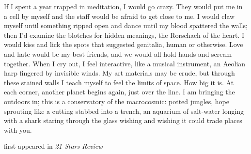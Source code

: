 If I spent a year trapped in meditation, I would go crazy. They would
put me in a cell by myself and the staff would be afraid to get close to
me. I would claw myself until something ripped open and dance until my
blood spattered the walls; then I'd examine the blotches for hidden
meanings, the Rorschach of the heart. I would kiss and lick the spots
that suggested genitalia, human or otherwise. Love and hate would be my
best friends, and we would all hold hands and scream together. When I
cry out, I feel interactive, like a musical instrument, an Aeolian harp
fingered by invisible winds. My art materials may be crude, but through
these stained walls I teach myself to feel the limits of space. How big
it is. At each corner, another planet begins again, just over the line.
I am bringing the outdoors in; this is a conservatory of the
macrocosmic: potted jungles, hope sprouting like a cutting stabbed into
a trench, an aquarium of salt-water longing with a shark staring through
the glass wishing and wishing it could trade places with you.

first appeared in \emph{21 Stars Review}
